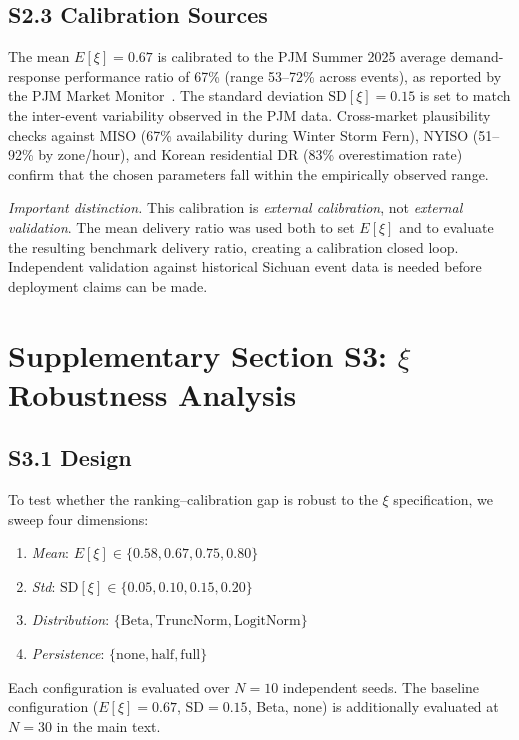 \subsection*{S2.3 Calibration Sources}

The mean $E[\xi] = 0.67$ is calibrated to the PJM Summer 2025
average demand-response performance ratio of 67\% (range
53--72\% across events), as reported by the PJM Market
Monitor~\citep{pjm2026marketmonitor}. The standard deviation
$\mathrm{SD}[\xi] = 0.15$ is set to match the inter-event
variability observed in the PJM data. Cross-market plausibility
checks against MISO (67\% availability during Winter Storm
Fern), NYISO (51--92\% by zone/hour), and Korean residential
DR (83\% overestimation rate) confirm that the chosen
parameters fall within the empirically observed range.

\textit{Important distinction.} This calibration is
\emph{external calibration}, not \emph{external validation}.
The mean delivery ratio was used both to set $E[\xi]$ and to
evaluate the resulting benchmark delivery ratio, creating a
calibration closed loop. Independent validation against
historical Sichuan event data is needed before deployment
claims can be made.


\section*{Supplementary Section S3: $\xi$ Robustness Analysis}

\subsection*{S3.1 Design}

To test whether the ranking--calibration gap is robust to the
$\xi$ specification, we sweep four dimensions:
\begin{enumerate}
    \item \textit{Mean}: $E[\xi] \in \{0.58, 0.67, 0.75, 0.80\}$
    \item \textit{Std}: $\mathrm{SD}[\xi] \in \{0.05, 0.10, 0.15, 0.20\}$
    \item \textit{Distribution}: $\{\mathrm{Beta}, \mathrm{TruncNorm}, \mathrm{LogitNorm}\}$
    \item \textit{Persistence}: $\{\mathrm{none}, \mathrm{half}, \mathrm{full}\}$
\end{enumerate}
Each configuration is evaluated over $N = 10$ independent
seeds. The baseline configuration ($E[\xi]{=}0.67$,
$\mathrm{SD}{=}0.15$, Beta, none) is additionally evaluated
at $N = 30$ in the main text.

